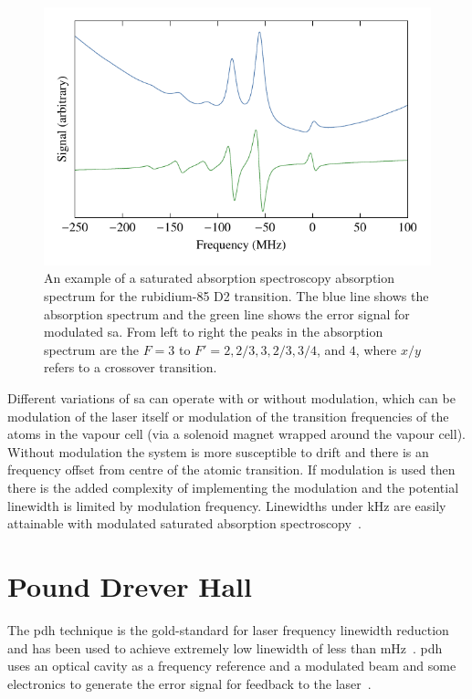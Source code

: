 \begin{figure}
    \center
    \includegraphics{part1/Figs/SatAbsSpectrum.pdf}
    \caption[Saturated absorption spectroscopy absorption spectrum.]{An example of a saturated absorption spectroscopy absorption spectrum for the rubidium-85 D2 transition.
    The blue line shows the absorption spectrum and the green line shows the error signal for modulated \gls{sa}.
    From left to right the peaks in the absorption spectrum are the $F=3$ to $F'=2,2/3,3,2/3,3/4$, and $4$, where $x/y$ refers to a crossover transition.}
    \label{figure:satabsspectrum}
\end{figure}

Different variations of \gls{sa} can operate with or without modulation, which can be modulation of the laser itself or modulation of the transition frequencies of the atoms in the vapour cell (via a solenoid magnet wrapped around the vapour cell).
Without modulation the system is more susceptible to drift and there is an frequency offset from centre of the atomic transition.
If modulation is used then there is the added complexity of implementing the modulation and the potential linewidth is limited by modulation frequency.
Linewidths under \unit[150]{kHz} are easily attainable with modulated saturated absorption spectroscopy~\cite{saliba_linewidths_2009}.

\section{Pound Drever Hall}

The \gls{pdh} technique is the gold-standard for laser frequency linewidth reduction and has been used to achieve extremely low linewidth of less than \unit[40]{mHz}~\cite{kessler_sub-40-mhz-linewidth_2012}.
\Gls{pdh} uses an optical cavity as a frequency reference and a modulated beam and some electronics to generate the error signal for feedback to the laser~\cite{drever_laser_1983,black_introduction_2000}.

